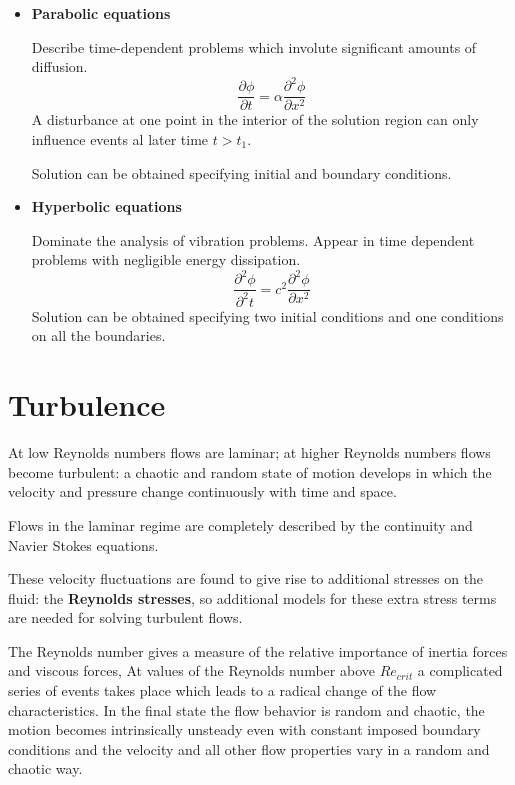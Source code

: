 \documentclass[a4paper, 15pt]{article}
\begin{document}
\begin{itemize}
	\item \textbf{Parabolic equations}
	
	Describe time-dependent problems which involute significant amounts of diffusion. 
	\[\dfrac{\partial\phi}{\partial t} = \alpha\dfrac{\partial^2\phi}{\partial x^2}\]
	A disturbance at one point in the interior of the solution region can only influence events al later time $t>t_1$. 
	
	Solution can be obtained specifying initial and boundary conditions.
	
	\item \textbf{Hyperbolic equations}
	
	Dominate the analysis of vibration problems. Appear in time dependent problems with negligible energy dissipation. 	
	\[\dfrac{\partial^2\phi}{\partial^2 t} = c^2\dfrac{\partial^2\phi}{\partial x^2}\]
	Solution can be obtained specifying two initial conditions and one conditions on all the boundaries.
\end{itemize}




\newpage




\part{Turbulence}


At low Reynolds numbers flows are laminar; at higher Reynolds numbers flows become
turbulent: a chaotic and random state of motion develops in which the velocity and pressure
change continuously with time and space. \newline 

Flows in the laminar regime are completely described by the continuity and
Navier Stokes equations. \newline 

These velocity fluctuations are found to give rise to additional stresses on the fluid: the
\textbf{Reynolds stresses}, so additional models for these extra stress terms are needed for solving
turbulent flows. 

The Reynolds number gives a measure of the relative importance of inertia forces and viscous forces, At
values of the Reynolds number above $Re_{crit}$ a complicated series of events takes place which leads to a radical change of the flow characteristics.
In the final state the flow behavior is random and chaotic, the motion becomes intrinsically
unsteady even with constant imposed boundary conditions and the velocity and all other flow
properties vary in a random and chaotic way. 
\end{document}

